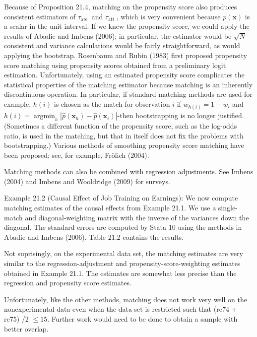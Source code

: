 \documentclass[10pt]{article}
\begin{document}
Because of Proposition 21.4, matching on the propensity score also produces consistent estimators of $\tau_{\text {ate }}$ and $\tau_{\text {att }}$, which is very convenient because $p(\mathbf{x})$ is a scalar in the unit interval. If we knew the propensity score, we could apply the results of Abadie and Imbens (2006); in particular, the estimator would be $\sqrt{N}$-consistent and variance calculations would be fairly straightforward, as would applying the bootstrap. Rosenbaum and Rubin (1983) first proposed propensity score matching using propensity scores obtained from a preliminary logit estimation. Unfortunately, using an estimated propensity score complicates the statistical properties of the matching estimator because matching is an inherently discontinuous operation. In particular, if standard matching methods are used-for example, $h(i)$ is chosen as the match for observation $i$ if $w_{h(i)}=1-w_{i}$ and $h(i)=\operatorname{argmin}_{h}\left|\hat{p}\left(\mathbf{x}_{h}\right)-\hat{p}\left(\mathbf{x}_{i}\right)\right|$-then bootstrapping is no longer justified. (Sometimes a different function of the propensity score, such as the log-odds ratio, is used in the matching, but that in itself does not fix the problems with bootstrapping.) Various methods of smoothing propensity score matching have been proposed; see, for example, Frölich (2004).

Matching methods can also be combined with regression adjustments. See Imbens (2004) and Imbens and Wooldridge (2009) for surveys.

Example 21.2 (Causal Effect of Job Training on Earnings): We now compute matching estimates of the causal effects from Example 21.1. We use a single-match and diagonal-weighting matrix with the inverse of the variances down the diagonal. The standard errors are computed by Stata 10 using the methods in Abadie and Imbens (2006). Table 21.2 contains the results.

Not suprisingly, on the experimental data set, the matching estimates are very similar to the regression-adjustment and propensity-score-weighting estimates obtained in Example 21.1. The estimates are somewhat less precise than the regression and propensity score estimates.

Unfortunately, like the other methods, matching does not work very well on the nonexperimental data-even when the data set is restricted such that (re74 + re75) /2 $\leq 15$. Further work would need to be done to obtain a sample with better overlap.
\end{document}
